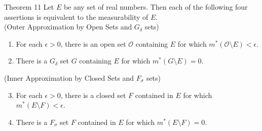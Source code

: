 \begin{namedthm*}{Theorem 11}
	Let $E$ be any set of real numbers. Then each of the following four assertions is equivalent to the measurability of $E$.\\
	(Outer Approximation by Open Sets and $G_\delta$ sets)
	\begin{enumerate}[label=(\roman*),align=left]
        \item For each $\epsilon>0$, there is an open set $\mathcal{O}$ containing $E$ for which $m^*(\mathcal{O}\setminus E)<\epsilon$.
        \item There is a $G_\delta$ set $G$ containing $E$ for which $m^*(G\setminus E)=0$. 
    \end{enumerate}
	(Inner Approximation by Closed Sets and $F_\sigma$ sets)
	\begin{enumerate}[label=(\roman*),align=left]
        \setcounter{enumi}{2}
		\item For each $\epsilon>0$, there is a closed set $F$ contained in $E$ for which $m^*(E\setminus F)<\epsilon$.
        \item There is a $F_\sigma$ set $F$ contained in $E$ for which $m^*(E\setminus F)=0$.
    \end{enumerate}
\end{namedthm*}

